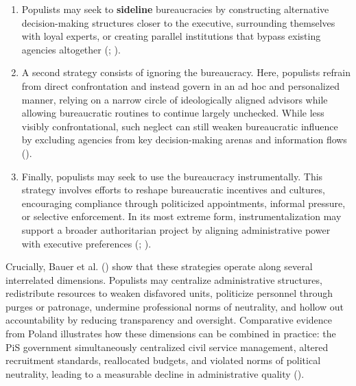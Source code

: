 \documentclass[
  11pt,
  letterpaper,
  DIV=11,
  numbers=noendperiod]{scrartcl}
\providecommand{\tightlist}{%
  \setlength{\itemsep}{0pt}\setlength{\parskip}{0pt}}
\begin{document}
\begin{enumerate}
\def\labelenumi{\arabic{enumi}.}
\tightlist
\item
  Populists may seek to \textbf{sideline} bureaucracies by constructing
  alternative decision-making structures closer to the executive,
  surrounding themselves with loyal experts, or creating parallel
  institutions that bypass existing agencies altogether
  (;
  ).
\item
  A second strategy consists of ignoring the bureaucracy. Here,
  populists refrain from direct confrontation and instead govern in an
  ad hoc and personalized manner, relying on a narrow circle of
  ideologically aligned advisors while allowing bureaucratic routines to
  continue largely unchecked. While less visibly confrontational, such
  neglect can still weaken bureaucratic influence by excluding agencies
  from key decision-making arenas and information flows
  ().
\item
  Finally, populists may seek to use the bureaucracy instrumentally.
  This strategy involves efforts to reshape bureaucratic incentives and
  cultures, encouraging compliance through politicized appointments,
  informal pressure, or selective enforcement. In its most extreme form,
  instrumentalization may support a broader authoritarian project by
  aligning administrative power with executive preferences
  (;
  ).
\end{enumerate}

Crucially, Bauer et al. () show that these
strategies operate along several interrelated dimensions. Populists may
centralize administrative structures, redistribute resources to weaken
disfavored units, politicize personnel through purges or patronage,
undermine professional norms of neutrality, and hollow out
accountability by reducing transparency and oversight. Comparative
evidence from Poland illustrates how these dimensions can be combined in
practice: the PiS government simultaneously centralized civil service
management, altered recruitment standards, reallocated budgets, and
violated norms of political neutrality, leading to a measurable decline
in administrative quality ().
\end{document}

